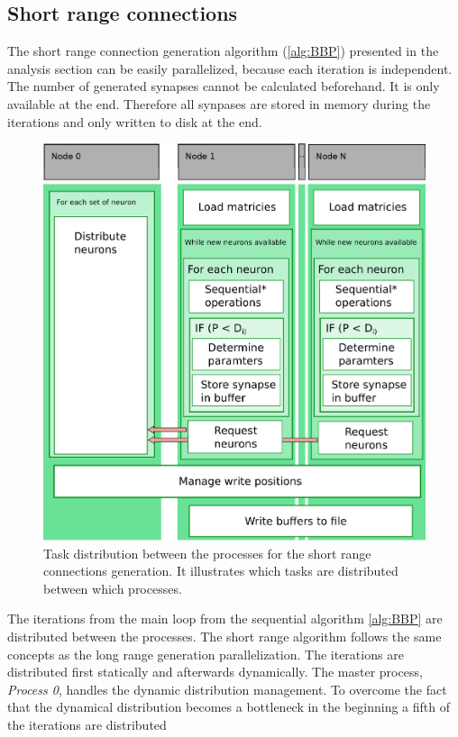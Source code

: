 \subsection{Short range connections}
The short range connection generation algorithm (\ref{alg:BBP}) presented in the analysis section can be easily parallelized,
because each iteration is independent. The number of generated synapses cannot be calculated beforehand. It is only available
at the end. Therefore all synpases are stored in memory during the iterations and only written to disk 
at the end.
\begin{figure}[ht!]
\centering
\includegraphics[scale=0.5]{pictures/shortRange_parallelAlg.eps}
\caption{Task distribution between the processes for the short range connections generation.
It illustrates which tasks are distributed between which processes.}
\label{fig:shortrangeparallel}
\end{figure}
The iterations from the main loop from the sequential algorithm \ref{alg:BBP} are distributed between the processes.
The short range algorithm follows the same concepts as the long range generation parallelization.
The iterations are distributed first statically and afterwards dynamically.
The master process, \emph{Process 0}, handles the dynamic distribution management.
To overcome the fact that the dynamical distribution becomes a bottleneck in the beginning a fifth of the iterations are distributed
